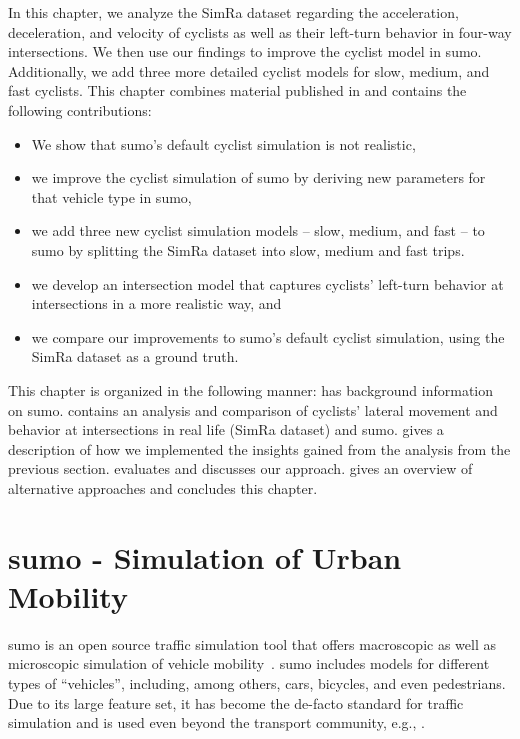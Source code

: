 In this chapter, we analyze the SimRa dataset regarding the acceleration, deceleration, and velocity of cyclists as well as their left-turn behavior in four-way intersections.
We then use our findings to improve the cyclist model in \ac{sumo}.
Additionally, we add three more detailed cyclist models for slow, medium, and fast cyclists.
This chapter combines material published in \cite{karakaya2022realistic,karakaya2023achieving} and contains the following contributions:
\begin{itemize}
    \item We show that \ac{sumo}'s default cyclist simulation is not realistic,
    \item we improve the cyclist simulation of \ac{sumo} by deriving new parameters for that vehicle type in \ac{sumo},
    \item we add three new cyclist simulation models -- slow, medium, and fast -- to \ac{sumo} by splitting the SimRa dataset into slow, medium and fast trips.
    \item we develop an intersection model that captures cyclists' left-turn behavior at intersections in a more realistic way, and
    \item we compare our improvements to \ac{sumo}'s default cyclist simulation, using the SimRa dataset as a ground truth.
\end{itemize}

This chapter is organized in the following manner:
 has background information on \ac{sumo}.
 contains an analysis and comparison of cyclists' lateral movement and behavior at intersections in real life (SimRa dataset) and \ac{sumo}.
 gives a description of how we implemented the insights gained from the analysis from the previous section.
 evaluates and  discusses our approach.
 gives an overview of alternative approaches and  concludes this chapter.

\section{\ac{sumo} - Simulation of Urban Mobility}
\label{sec:sumo_background}
\ac{sumo} is an open source traffic simulation tool that offers macroscopic as well as microscopic simulation of vehicle mobility~\cite{lopez2018microscopic}.
\ac{sumo} includes models for different types of ``vehicles'', including, among others, cars, bicycles, and even pedestrians.
Due to its large feature set, it has become the de-facto standard for traffic simulation and is used even beyond the transport community, e.g., \cite{beilharz2021towards}.

